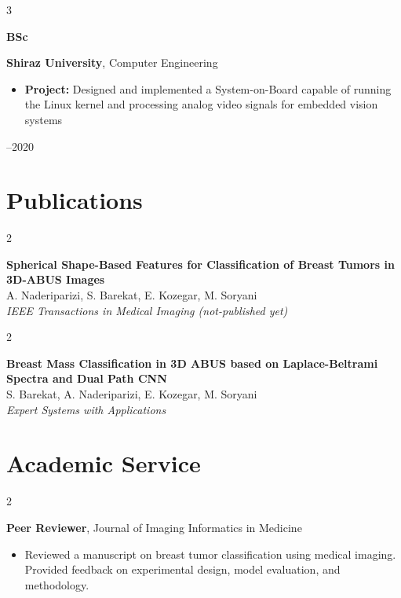 \documentclass[10pt, letterpaper]{article}
\newenvironment{highlights}{
    \begin{itemize}[
        topsep=0.10 cm,
        parsep=0.10 cm,
        partopsep=0pt,
        itemsep=0pt,
        leftmargin=0.4 cm + 10pt
    ]
}{
    \end{itemize}
}
\newenvironment{twocolentry}[2][]{
    \onecolentry
    \def\secondColumn{#2}
    \setcolumnwidth{\fill, 4.5 cm}
    \begin{paracol}{2}
}{
    \switchcolumn \raggedleft \secondColumn
    \end{paracol}
    \endonecolentry
}
\newenvironment{threecolentry}[3][]{
    \onecolentry
    \def\thirdColumn{#3}
    \setcolumnwidth{1 cm, \fill, 4.5 cm}
    \begin{paracol}{3}
    {\raggedright #2} \switchcolumn
}{
    \switchcolumn \raggedleft \thirdColumn
    \end{paracol}
    \endonecolentry
}
\begin{document}
    \begin{threecolentry}{\textbf{BSc}}{2015--2020}
        \textbf{Shiraz University},
        Computer Engineering
        \begin{highlights}
            \item \textbf{Project:} Designed and implemented a System-on-Board capable of running the Linux kernel and processing analog video signals for embedded vision systems
        \end{highlights}
    \end{threecolentry}

    \section{Publications}
    \begin{twocolentry}{2026}
        \textbf{Spherical Shape-Based Features for Classification of Breast Tumors in 3D-ABUS Images} \\
        A. Naderiparizi, S. Barekat, E. Kozegar, M. Soryani \\
        \textit{IEEE Transactions in Medical Imaging (not-published yet)}
    \end{twocolentry}

    \begin{twocolentry}{2025}
        \textbf{Breast Mass Classification in 3D ABUS based on Laplace-Beltrami Spectra and Dual Path CNN} \\
        S. Barekat, A. Naderiparizi, E. Kozegar, M. Soryani \\
        \textit{Expert Systems with Applications}
    \end{twocolentry}

    \section{Academic Service}
    \begin{twocolentry}{2026}
        \textbf{Peer Reviewer}, Journal of Imaging Informatics in Medicine
        \begin{highlights}
            \item Reviewed a manuscript on breast tumor classification using medical imaging. Provided feedback on experimental design, model evaluation, and methodology.
        \end{highlights}
    \end{twocolentry}
\end{document}
